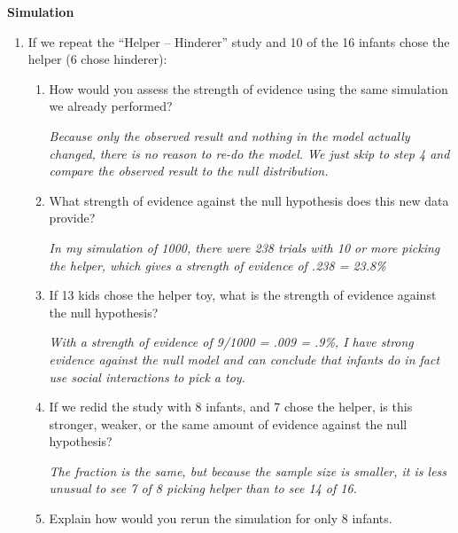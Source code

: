 \begin{center}
{\bf  Simulation}
\end{center}
\begin{enumerate}
\item If we repeat the ``Helper -- Hinderer'' study and  10 of
    the 16 infants chose the helper (6 chose hinderer):
    \begin{enumerate}
    \item How would you assess the strength of evidence using the same
      simulation we already performed?
\begin{students}
        \vspace{3.5cm}
\end{students}

\begin{key}
{\it
      Because only the observed result and nothing in the model
      actually changed, there is no reason to re-do the model.  We
      just skip to step 4 and compare the observed result to the
      null distribution. }
\end{key}
\item What strength of evidence against the null hypothesis
      does this new data provide?
\begin{students}
        \vspace{3.5cm}
\end{students}

\begin{key}
{\it
      In my simulation of 1000, there were 238 trials with 10 or
      more picking the helper, which gives a strength of evidence
      of .238 = 23.8\%}
\end{key}
\item If 13 kids chose the helper toy, what is the strength of evidence
  against the null hypothesis? 
\begin{students}
        \vspace{3.5cm}
\end{students}

\begin{key}
{\it
       With a strength of evidence of 9/1000 = .009 = .9\%, I have
      strong evidence against the null model and can conclude that
      infants do in fact use social interactions to pick a toy. }
\end{key}
\item If we redid the study with 8 infants, and 7 chose the
      helper, is this stronger, weaker, or the same amount of evidence
      against the null hypothesis?      
\begin{students}
        \vspace{3.5cm}
\end{students}
\begin{key}
{\it
      The fraction is the same, but because the sample size is
      smaller, it is less unusual to see 7 of 8 picking helper than
      to see 14 of 16.}
\end{key}
\item Explain how would you rerun the simulation for only 8 infants.
\begin{students}
        \vspace{2cm}
\end{students}
      

\end{enumerate}
\end{enumerate}
